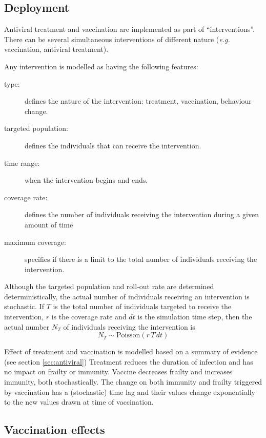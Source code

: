 \documentclass[11pt, onecolumn]{article}
\newcommand{\eg}{\textit{e.g.}\xspace}
\begin{document}
\subsection{Deployment}

Antiviral treatment and vaccination are implemented as part of ``interventions''. There can be several simultaneous interventions of different nature (\eg vaccination, antiviral treatment).

Any intervention is modelled as having the following features:
\begin{description}
\item[type: ] defines the nature of the intervention: treatment, vaccination, behaviour change.
\item[targeted population:] defines the individuals that can receive the intervention.
\item[time range:] when the intervention begins and ends.
\item[coverage rate:] defines the number of individuals receiving the intervention during a given amount of time
\item[maximum coverage:] specifies if there is a limit to the total number of individuals receiving the intervention.
\end{description}
 
Although the targeted population and roll-out rate are determined deterministically, the actual number of individuals receiving an intervention is stochastic. If $T$ is the total number of individuals targeted to receive the intervention, $r$ is the coverage rate and $dt$ is the simulation time step, then the actual number $N_T$ of individuals receiving the intervention is
\begin{equation}
N_T \sim \text{Poisson}(r\,T\,dt)
\end{equation}

Effect of treatment and vaccination is modelled based on a summary of evidence (see section \ref{sec:antiviral})
Treatment reduces the duration of infection and has no impact on frailty or immunity. Vaccine decreases frailty and increases immunity, both stochastically. The change on both immunity and frailty triggered by vaccination has a (stochastic) time lag and their values change exponentially to the new values drawn at time of vaccination.


\subsection{Vaccination effects}
\end{document}
